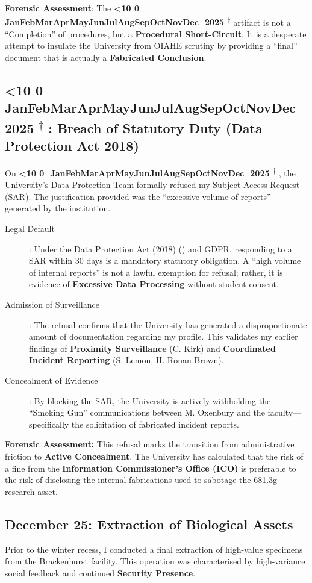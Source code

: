 \documentclass{EMBASSY}
\DeclareRobustCommand{\gmt}[3]{%
    \texorpdfstring{%
        {\color{DateGold}\textbf{%
            \ifnum#1<10 0\fi#1\,\textperiodcentered\,%
            \ifcase#2\or Jan\or Feb\or Mar\or Apr\or May\or Jun\or Jul\or Aug\or Sep\or Oct\or Nov\or Dec\fi
            \,\textperiodcentered\,20#3%
            \textsuperscript{$\dagger$}%
        }}%
    }{%
        (#1/#2/#3)%
    }%
}
\begin{document}
\noindent\textbf{Forensic Assessment}: The \gmt{18}{12}{25} artifact is not a ``Completion'' of procedures, but a \textbf{Procedural Short-Circuit}. It is a desperate attempt to insulate the University from OIAHE scrutiny by providing a ``final'' document that is actually a \textbf{Fabricated Conclusion}.

\subsection{\gmt{19}{12}{25}: Breach of Statutory Duty (Data Protection Act 2018)}
On \gmt{19}{12}{25}, the University’s Data Protection Team formally refused my Subject Access Request (SAR). The justification provided was the ``excessive volume of reports'' generated by the institution.

\begin{description}
	\item[Legal Default]: Under the Data Protection Act (2018) (\cite{DPA18}) and GDPR, responding to a SAR within 30 days is a mandatory statutory obligation. A ``high volume of internal reports'' is not a lawful exemption for refusal; rather, it is evidence of \textbf{Excessive Data Processing} without student consent.
	\item[Admission of Surveillance]: The refusal confirms that the University has generated a disproportionate amount of documentation regarding my profile. This validates my earlier findings of \textbf{Proximity Surveillance} (C. Kirk) and \textbf{Coordinated Incident Reporting} (S. Lemon, H. Ronan-Brown).
	\item[Concealment of Evidence]: By blocking the SAR, the University is actively withholding the ``Smoking Gun'' communications between M. Oxenbury and the faculty---specifically the solicitation of fabricated incident reports.
\end{description}

\noindent\textbf{Forensic Assessment:} This refusal marks the transition from administrative friction to \textbf{Active Concealment}. The University has calculated that the risk of a fine from the \textbf{Information Commissioner’s Office (ICO)} is preferable to the risk of disclosing the internal fabrications used to sabotage the 681.3g research asset.

\subsection{December 25: Extraction of Biological Assets}
Prior to the winter recess, I conducted a final extraction of high-value specimens from the Brackenhurst facility. This operation was characterised by high-variance social feedback and continued \textbf{Security Presence}.
\end{document}
